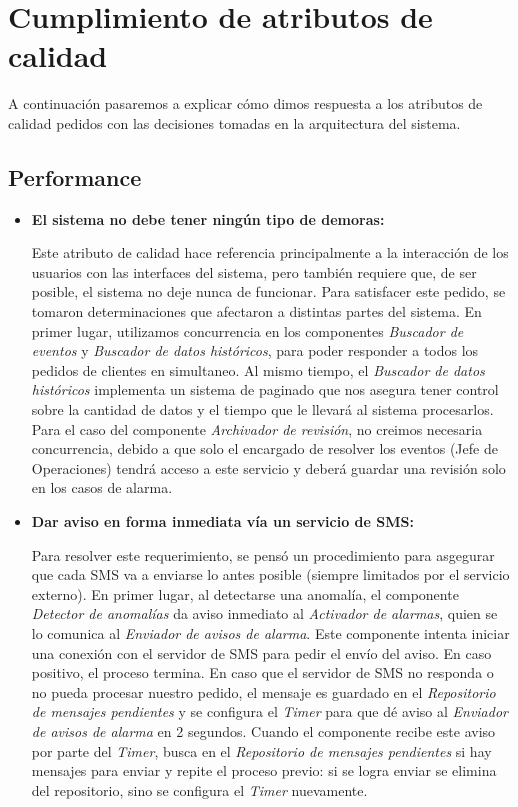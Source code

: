 \section{Cumplimiento de atributos de calidad}

\par A continuación pasaremos a explicar cómo dimos respuesta a los atributos de calidad pedidos con las decisiones tomadas en la arquitectura del sistema.

\subsection{Performance}

\begin{itemize}
    \item \textbf{El sistema no debe tener ningún tipo de demoras:}
    \par Este atributo de calidad hace referencia principalmente a la interacción de los usuarios con las interfaces del sistema, pero también requiere que, de ser posible, el sistema no deje nunca de funcionar. Para satisfacer este pedido, se tomaron determinaciones que afectaron a distintas partes del sistema. En primer lugar, utilizamos concurrencia en los componentes \textit{Buscador de eventos} y \textit{Buscador de datos históricos}, para poder responder a todos los pedidos de clientes en simultaneo. Al mismo tiempo, el \textit{Buscador de datos históricos} implementa un sistema de paginado que nos asegura tener control sobre la cantidad de datos y el tiempo que le llevará al sistema procesarlos. Para el caso del componente \textit{Archivador de revisión}, no creimos necesaria concurrencia, debido a que solo el encargado de resolver los eventos (Jefe de Operaciones) tendrá acceso a este servicio y deberá guardar una revisión solo en los casos de alarma.
    
    \item \textbf{Dar aviso en forma inmediata vía un servicio de SMS:}
    \par Para resolver este requerimiento, se pensó un procedimiento para asgegurar que cada SMS va a enviarse lo antes posible (siempre limitados por el servicio externo). En primer lugar, al detectarse una anomalía, el componente \textit{Detector de anomalías} da aviso inmediato al \textit{Activador de alarmas}, quien se lo comunica al \textit{Enviador de avisos de alarma}. Este componente intenta iniciar una conexión con el servidor de SMS para pedir el envío del aviso. En caso positivo, el proceso termina. En caso que el servidor de SMS no responda o no pueda procesar nuestro pedido, el mensaje es guardado en el \textit{Repositorio de mensajes pendientes} y se configura el \textit{Timer} para que dé aviso al \textit{Enviador de avisos de alarma} en 2 segundos. Cuando el componente recibe este aviso por parte del \textit{Timer}, busca en el \textit{Repositorio de mensajes pendientes} si hay mensajes para enviar y repite el proceso previo: si se logra enviar se elimina del repositorio, sino se configura el \textit{Timer} nuevamente.


\end{itemize}
